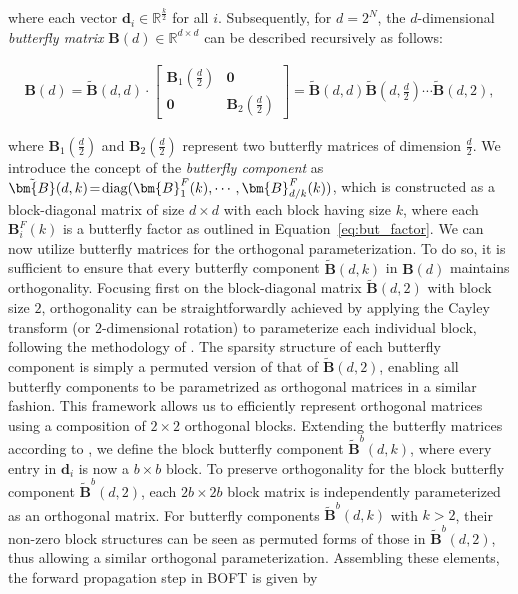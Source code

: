 where each vector $\bm{d}_i\in\mathbb{R}^{\frac{k}{2}}$ for all $i$. Subsequently, for $d=2^N$, the $d$-dimensional \emph{butterfly matrix} $\bm{B}(d)\in\mathbb{R}^{d\times d}$ can be described recursively as follows:

\begin{equation}
\begin{aligned}
    \!\!\bm{B}(d)=\tilde{\bm{B}}(d,d)\!\cdot\!\begin{bmatrix}
    \bm{B}_1(\frac{d}{2})\!\!\!\!\! & \bm{0} \\
    \bm{0}\!\!\!\!\! &\bm{B}_2(\frac{d}{2})
    \end{bmatrix}= \tilde{\bm{B}}(d,d)\tilde{\bm{B}}(d,\frac{d}{2})\cdots\tilde{\bm{B}}(d,2),
\end{aligned}
\end{equation}

where $\bm{B}_1(\frac{d}{2})$ and $\bm{B}_2(\frac{d}{2})$ represent two butterfly matrices of dimension $\frac{d}{2}$. We introduce the concept of the \emph{butterfly component} as $\thickmuskip=2mu \medmuskip=2mu \tilde{\bm{B}}(d,k)=\text{diag}(\bm{B}^F_1(k),\cdots,\bm{B}^F_{d/k}(k))$, which is constructed as a block-diagonal matrix of size $d\times d$ with each block having size $k$, where each $\bm{B}^F_i(k)$ is a butterfly factor as outlined in Equation~\ref{eq:but_factor}. We can now utilize butterfly matrices for the orthogonal parameterization. To do so, it is sufficient to ensure that every butterfly component $\tilde{\bm{B}}(d,k)$ in $\bm{B}(d)$ maintains orthogonality. Focusing first on the block-diagonal matrix $\tilde{\bm{B}}(d,2)$ with block size $2$, orthogonality can be straightforwardly achieved by applying the Cayley transform (or $2$-dimensional rotation) to parameterize each individual block, following the methodology of \cite{liu2021orthogonal,qiu2023controlling}. The sparsity structure of each butterfly component is simply a permuted version of that of $\tilde{\bm{B}}(d,2)$, enabling all butterfly components to be parametrized as orthogonal matrices in a similar fashion. This framework allows us to efficiently represent orthogonal matrices using a composition of $2\times 2$ orthogonal blocks. Extending the butterfly matrices according to \cite{chen2022pixelated}, we define the block butterfly component $\tilde{\bm{B}}^b(d,k)$, where every entry in $\bm{d}_i$ is now a $b\times b$ block. To preserve orthogonality for the block butterfly component $\tilde{\bm{B}}^b(d,2)$, each $2b\times 2b$ block matrix is independently parameterized as an orthogonal matrix. For butterfly components $\tilde{\bm{B}}^b(d,k)$ with $k>2$, their non-zero block structures can be seen as permuted forms of those in $\tilde{\bm{B}}^b(d,2)$, thus allowing a similar orthogonal parameterization. Assembling these elements, the forward propagation step in BOFT is given by

